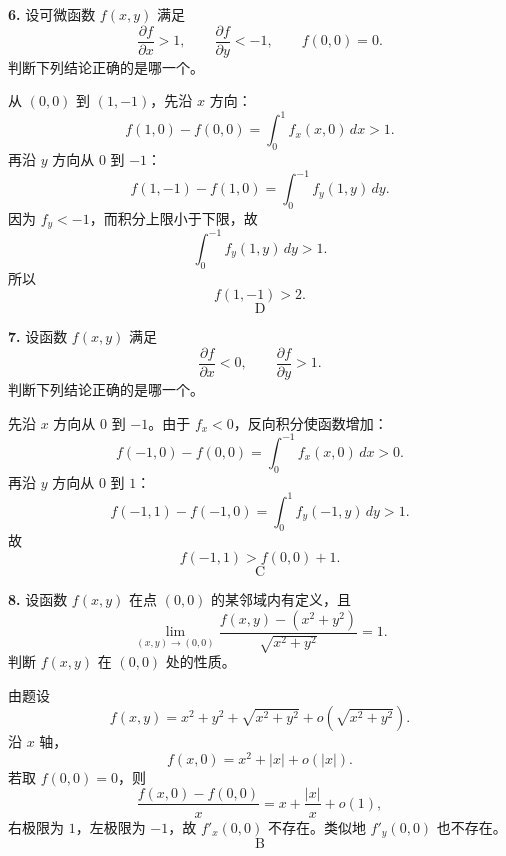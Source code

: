 \begin{problemblock}
\textbf{6.} 设可微函数 \(f(x,y)\) 满足
\[
\frac{\partial f}{\partial x}>1,\qquad \frac{\partial f}{\partial y}<-1,\qquad f(0,0)=0.
\]
判断下列结论正确的是哪一个。
\end{problemblock}

\begin{solutionblock}
从 \((0,0)\) 到 \((1,-1)\)，先沿 \(x\) 方向：
\[
f(1,0)-f(0,0)=\int_0^1 f_x(x,0)\,dx>1.
\]
再沿 \(y\) 方向从 \(0\) 到 \(-1\)：
\[
f(1,-1)-f(1,0)=\int_0^{-1} f_y(1,y)\,dy.
\]
因为 \(f_y<-1\)，而积分上限小于下限，故
\[
\int_0^{-1} f_y(1,y)\,dy>1.
\]
所以
\[
f(1,-1)>2.
\]
\[
\boxed{\text{D}}
\]
\end{solutionblock}

\begin{problemblock}
\textbf{7.} 设函数 \(f(x,y)\) 满足
\[
\frac{\partial f}{\partial x}<0,\qquad \frac{\partial f}{\partial y}>1.
\]
判断下列结论正确的是哪一个。
\end{problemblock}

\begin{solutionblock}
先沿 \(x\) 方向从 \(0\) 到 \(-1\)。由于 \(f_x<0\)，反向积分使函数增加：
\[
f(-1,0)-f(0,0)=\int_0^{-1}f_x(x,0)\,dx>0.
\]
再沿 \(y\) 方向从 \(0\) 到 \(1\)：
\[
f(-1,1)-f(-1,0)=\int_0^1f_y(-1,y)\,dy>1.
\]
故
\[
f(-1,1)>f(0,0)+1.
\]
\[
\boxed{\text{C}}
\]
\end{solutionblock}

\begin{problemblock}
\textbf{8.} 设函数 \(f(x,y)\) 在点 \((0,0)\) 的某邻域内有定义，且
\[
\lim_{(x,y)\to(0,0)}
\frac{f(x,y)-(x^2+y^2)}{\sqrt{x^2+y^2}}=1.
\]
判断 \(f(x,y)\) 在 \((0,0)\) 处的性质。
\end{problemblock}

\begin{solutionblock}
由题设
\[
f(x,y)=x^2+y^2+\sqrt{x^2+y^2}+o\left(\sqrt{x^2+y^2}\right).
\]
沿 \(x\) 轴，
\[
f(x,0)=x^2+|x|+o(|x|).
\]
若取 \(f(0,0)=0\)，则
\[
\frac{f(x,0)-f(0,0)}{x}
=x+\frac{|x|}{x}+o(1),
\]
右极限为 \(1\)，左极限为 \(-1\)，故 \(f'_x(0,0)\) 不存在。类似地 \(f'_y(0,0)\) 也不存在。
\[
\boxed{\text{B}}
\]
\end{solutionblock}

